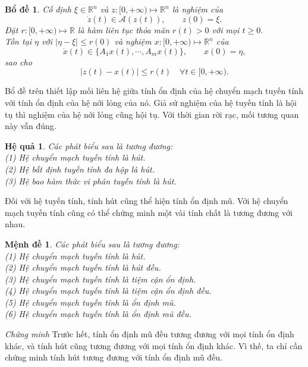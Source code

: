 \documentclass[14pt,a4paper,oneside]{report}		%
\newtheorem{lemma}[theorem]{Bổ đề}
\newtheorem{corollary}[theorem]{Hệ quả}
\newtheorem{proposition}[theorem]{Mệnh đề}
\begin{document}
\begin{lemma} \label{le1}
Cố định $\xi\in\mathbb{R}^n$ và $z:[0,+\infty)\mapsto\mathbb{R}^n$ là nghiệm của
$$\dot{z}(t)\in\mathcal{A}(z(t)), \qquad z(0)=\xi.$$
Đặt $r:[0,+\infty)\mapsto\mathbb{R}$ là hàm liên tục thỏa mãn $r(t)>0$ với mọi $t\geq 0$.\\
Tồn tại $\eta$ với $|\eta - \xi|\leq r(0)$ và nghiệm $x:[0,+\infty)\mapsto\mathbb{R}^n$ của
$$\dot{x}(t)\in\{A_1x(t),\cdots,A_mx(t)\},\qquad x(0)=\eta,$$
sao cho
$$|z(t)-x(t)|\leq r(t)\quad\forall t\in[0,+\infty).$$
\end{lemma}

Bổ đề trên thiết lập mối liên hệ giữa tính ổn định của hệ chuyển mạch tuyến tính với tính ổn định của hệ nới lỏng của nó. Giả sử nghiệm của hệ tuyến tính là hội tụ thì nghiệm của hệ nới lỏng cũng hội tụ. Với thời gian rời rạc, mối tương quan này vẫn đúng.

\begin{corollary} \label{co2-12}
Các phát biểu sau là tương đương:\\
(1) Hệ chuyển mạch tuyến tính là hút.\\
(2) Hệ bất định tuyến tính đa hộp là hút.\\
(3) Hệ bao hàm thức vi phân tuyến tính là hút.
\end{corollary}

Đối với hệ tuyến tính, tính hút cũng thể hiện tính ổn định mũ. Với hệ chuyển mạch tuyến tính cũng có thể chứng minh một vài tính chất là tương đương với nhau.

\begin{proposition} \label{pro2-13}
Các phát biểu sau là tương đương:\\
(1) Hệ chuyển mạch tuyến tính là hút.\\
(2) Hệ chuyển mạch tuyến tính là hút đều.\\
(3) Hệ chuyển mạch tuyến tính là tiệm cận ổn định.\\
(4) Hệ chuyển mạch tuyến tính là tiệm cận ổn định đều.\\
(5) Hệ chuyển mạch tuyến tính là ổn định mũ.\\
(6) Hệ chuyển mạch tuyến tính là ổn định mũ đều.
\end{proposition}

\textit{Chứng minh} Trước hết, tính ổn định mũ đều tương đương với mọi tính ổn định khác, và tính hút cũng tương đương với mọi tính ổn định khác. Vì thế, ta chỉ cần chứng minh tính hút tương đương với tính ổn định mũ đều.\\
\end{document}
